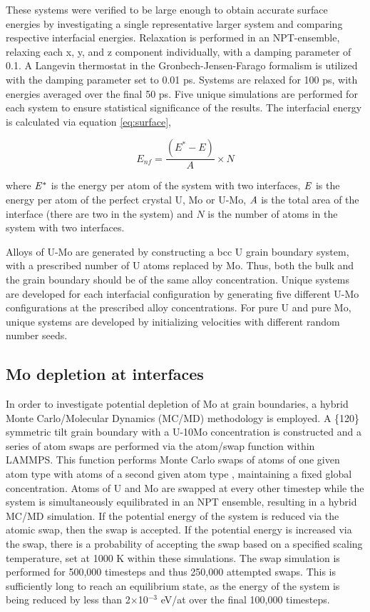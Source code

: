\documentclass[review]{elsarticle}
\begin{document}
These systems were verified to be large enough to obtain accurate surface energies by investigating a single representative larger system and comparing respective interfacial energies. Relaxation is performed in an NPT-ensemble, relaxing each x, y, and z component individually, with a damping parameter of 0.1. A Langevin thermostat in the Gronbech-Jensen-Farago \cite{gjf2014} formalism is utilized with the damping parameter set to 0.01 ps. Systems are relaxed for 100 ps, with energies averaged over the final 50 ps. Five unique simulations are performed for each system to ensure statistical significance of the results. The interfacial energy is calculated via equation \ref{eq:surface},

\begin{equation}
\label{eq:surface}
E_{nf}= \frac{(E^{*} - E)}{A} \times N
\end{equation}

where $\it{E^{*}}$ is the energy per atom of the system with two interfaces, $\it{E}$ is the energy per atom of the perfect crystal U, Mo or U-Mo, $\it{A}$ is the total area of the interface (there are two in the system) and $\textit{N}$ is the number of atoms in the system with two interfaces. 

Alloys of U-Mo are generated by constructing a bcc U grain boundary system, with a prescribed number of U atoms replaced by Mo. Thus, both the bulk and the grain boundary should be of the same alloy concentration. Unique systems are developed for each interfacial configuration by generating five different U-Mo configurations at the prescribed alloy concentrations. For pure U and pure Mo, unique systems are developed by initializing velocities with different random number seeds. 

\subsection{Mo depletion at interfaces}

In order to investigate potential depletion of Mo at grain boundaries, a hybrid Monte Carlo/Molecular Dynamics (MC/MD) methodology is employed. A \{120\} symmetric tilt grain boundary with a U-10Mo concentration is constructed and a series of atom swaps are performed via the atom/swap function within LAMMPS. This function performs Monte Carlo swaps of atoms of one given atom type with atoms of a second given atom type \cite{plimpton1995}, maintaining a fixed global concentration. Atoms of U and Mo are swapped at every other timestep while the system is simultaneously equilibrated in an NPT ensemble, resulting in a hybrid MC/MD simulation. If the potential energy of the system is reduced via the atomic swap, then the swap is accepted. If the potential energy is increased via the swap, there is a probability of accepting the swap based on a specified scaling temperature, set at 1000 K within these simulations. The swap simulation is performed for 500,000 timesteps and thus 250,000 attempted swaps. This is sufficiently long to reach an equilibrium state, as the energy of the system is being reduced by less than 2$\times$10$^{-3}$ eV/at over the final 100,000 timesteps.
\end{document}
